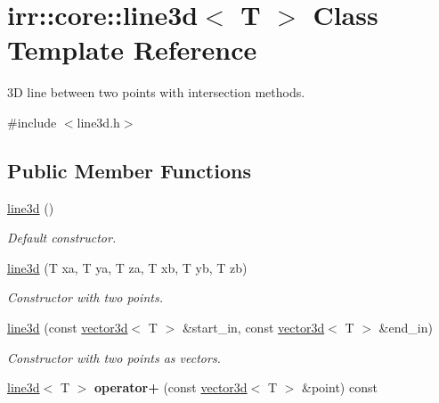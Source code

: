 \hypertarget{classirr_1_1core_1_1line3d}{}\section{irr\+:\+:core\+:\+:line3d$<$ T $>$ Class Template Reference}
\label{classirr_1_1core_1_1line3d}


3D line between two points with intersection methods.  




{\ttfamily \#include $<$line3d.\+h$>$}

\subsection*{Public Member Functions}
\begin{DoxyCompactItemize}
\item 
\hyperlink{classirr_1_1core_1_1line3d_ab88640572a102a9eebd1bf483b7d7e75}{line3d} ()
\begin{DoxyCompactList}\small\item\em Default constructor. \end{DoxyCompactList}\item 
\hyperlink{classirr_1_1core_1_1line3d_a19bc6c5661d8913ac6911b2513f7804f}{line3d} (T xa, T ya, T za, T xb, T yb, T zb)\hypertarget{classirr_1_1core_1_1line3d_a19bc6c5661d8913ac6911b2513f7804f}{}\label{classirr_1_1core_1_1line3d_a19bc6c5661d8913ac6911b2513f7804f}

\begin{DoxyCompactList}\small\item\em Constructor with two points. \end{DoxyCompactList}\item 
\hyperlink{classirr_1_1core_1_1line3d_ab32a434ffff553940d6f7febe29630cc}{line3d} (const \hyperlink{classirr_1_1core_1_1vector3d}{vector3d}$<$ T $>$ \&start\+\_\+in, const \hyperlink{classirr_1_1core_1_1vector3d}{vector3d}$<$ T $>$ \&end\+\_\+in)\hypertarget{classirr_1_1core_1_1line3d_ab32a434ffff553940d6f7febe29630cc}{}\label{classirr_1_1core_1_1line3d_ab32a434ffff553940d6f7febe29630cc}

\begin{DoxyCompactList}\small\item\em Constructor with two points as vectors. \end{DoxyCompactList}\item 
\hyperlink{classirr_1_1core_1_1line3d}{line3d}$<$ T $>$ {\bfseries operator+} (const \hyperlink{classirr_1_1core_1_1vector3d}{vector3d}$<$ T $>$ \&point) const \hypertarget{classirr_1_1core_1_1line3d_a1a83fbe4b2ac9a0e0127bc379bfcfa0a}{}\label{classirr_1_1core_1_1line3d_a1a83fbe4b2ac9a0e0127bc379bfcfa0a}


\end{DoxyCompactItemize}
